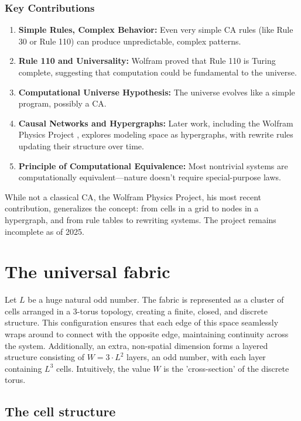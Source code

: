 \documentclass[12pt,english]{article}
\begin{document}
\subsubsection*{Key Contributions}
\begin{enumerate}
  \item \textbf{Simple Rules, Complex Behavior:} Even very simple CA rules (like Rule 30 or Rule 110) can produce unpredictable, complex patterns.
  \item \textbf{Rule 110 and Universality:} Wolfram proved that Rule 110 is Turing complete, suggesting that computation could be fundamental to the universe.
  \item \textbf{Computational Universe Hypothesis:} The universe evolves like a simple program, possibly a CA.
  \item \textbf{Causal Networks and Hypergraphs:} Later work, including the Wolfram Physics Project \cite{wolfram2020physics}, explores modeling space as hypergraphs, with rewrite rules updating their structure over time.
  \item \textbf{Principle of Computational Equivalence:} Most nontrivial systems are computationally equivalent—nature doesn't require special-purpose laws.
\end{enumerate}

While not a classical CA, the Wolfram Physics Project, his most recent contribution, generalizes the concept: from cells in a grid to nodes in a hypergraph, and from rule tables to rewriting systems. The project remains incomplete as of 2025.

\section{The universal fabric \label{sec:space-and-time}}

Let \ensuremath{L} be a huge natural odd number. The fabric is represented as a cluster of cells arranged in a 3-torus topology, creating a finite, closed, and discrete structure. This configuration ensures that each edge of this space seamlessly wraps around to connect with the opposite edge, maintaining continuity across the system. Additionally, an extra, non-spatial dimension forms a layered structure consisting of $W=3\cdot L^2$ layers, an odd number, with each layer containing $L^{3}$ cells. Intuitively, the value $W$ is the 'cross-section' of the discrete torus.

\subsection{The cell structure \label{subsec:The-cell-structure}}
\end{document}
